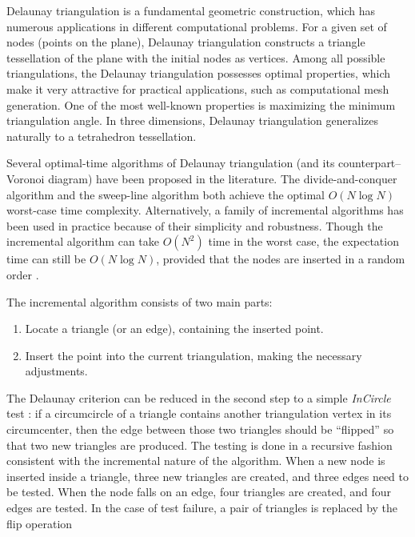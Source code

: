 
Delaunay triangulation \cite[]{delaunay2,sibson,stolfi} is a fundamental
geometric construction, which has numerous applications in different
computational problems. For a given set of nodes (points on the
plane), Delaunay triangulation constructs a triangle tessellation of
the plane with the initial nodes as vertices. Among all possible
triangulations, the Delaunay triangulation possesses optimal
properties, which make it very attractive for practical applications,
such as computational mesh generation. One of the most well-known
properties is maximizing the minimum triangulation angle. In three
dimensions, Delaunay triangulation generalizes naturally to a
tetrahedron tessellation.
\par
Several optimal-time algorithms of Delaunay triangulation (and its
counterpart--Voronoi diagram) have been proposed in the literature.
The divide-and-conquer algorithm \cite[]{shamos,stolfi} and the
sweep-line algorithm \cite[]{fortune} both achieve the optimal $O (N
\log N)$ worst-case time complexity. Alternatively, a family of
incremental algorithms has been used in practice because of their
simplicity and robustness. Though the incremental algorithm can take
$O (N^2)$ time in the worst case, the expectation time can still be $O
(N \log N)$, provided that the nodes are inserted in a random order
\cite[]{knuth}.
\par
The incremental algorithm consists of two main parts:
 \begin{enumerate}
 \item Locate a triangle (or an edge), containing the inserted point.
 \item Insert the point into the current triangulation, making the
   necessary adjustments.
 \end{enumerate}
\par
The Delaunay criterion can be reduced in the second step to a simple
\emph{InCircle} test \cite[]{stolfi}: if a circumcircle of a triangle
contains another triangulation vertex in its circumcenter, then the
edge between those two triangles should be ``flipped'' so that two new
triangles are produced. The testing is done in a recursive fashion
consistent with the incremental nature of the algorithm. When a new
node is inserted inside a triangle, three new triangles are created,
and three edges need to be tested. When the node falls on an edge,
four triangles are created, and four edges are tested. In the case of
test failure, a pair of triangles is replaced by the flip operation

